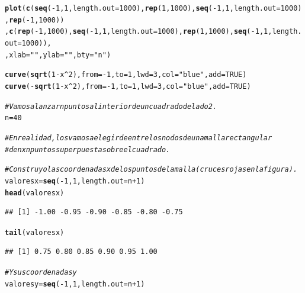 \documentclass[10pt,a4paper]{article}\usepackage[]{graphicx}\usepackage[]{color}
\makeatletter
\newcommand{\hlnum}[1]{\textcolor[rgb]{0.686,0.059,0.569}{#1}}%
\newcommand{\hlstr}[1]{\textcolor[rgb]{0.192,0.494,0.8}{#1}}%
\newcommand{\hlcom}[1]{\textcolor[rgb]{0.678,0.584,0.686}{\textit{#1}}}%
\newcommand{\hlopt}[1]{\textcolor[rgb]{0,0,0}{#1}}%
\newcommand{\hlstd}[1]{\textcolor[rgb]{0.345,0.345,0.345}{#1}}%
\newcommand{\hlkwb}[1]{\textcolor[rgb]{0.69,0.353,0.396}{#1}}%
\newcommand{\hlkwc}[1]{\textcolor[rgb]{0.333,0.667,0.333}{#1}}%
\newcommand{\hlkwd}[1]{\textcolor[rgb]{0.737,0.353,0.396}{\textbf{#1}}}%
\newenvironment{kframe}{%
 \def\at@end@of@kframe{}%
 \ifinner\ifhmode%
  \def\at@end@of@kframe{\end{minipage}}%
  \begin{minipage}{\columnwidth}%
 \fi\fi%
 \def\FrameCommand##1{\hskip\@totalleftmargin \hskip-\fboxsep
 \colorbox{shadecolor}{##1}\hskip-\fboxsep
     \hskip-\linewidth \hskip-\@totalleftmargin \hskip\columnwidth}%
 \MakeFramed {\advance\hsize-\width
   \@totalleftmargin\z@ \linewidth\hsize
   \@setminipage}}%
 {\par\unskip\endMakeFramed%
 \at@end@of@kframe}
\newenvironment{knitrout}{}{} %
\makeatother
\begin{document}
\begin{enumerate}
\begin{knitrout}
\begin{kframe}
\begin{alltt}
\hlkwd{plot}\hlstd{(}\hlkwd{c}\hlstd{(}\hlkwd{seq}\hlstd{(}\hlopt{-}\hlnum{1}\hlstd{,} \hlnum{1}\hlstd{,} \hlkwc{length.out} \hlstd{=} \hlnum{1000}\hlstd{),} \hlkwd{rep}\hlstd{(}\hlnum{1}\hlstd{,} \hlnum{1000}\hlstd{),} \hlkwd{seq}\hlstd{(}\hlopt{-}\hlnum{1}\hlstd{,} \hlnum{1}\hlstd{,} \hlkwc{length.out} \hlstd{=} \hlnum{1000}\hlstd{),} \hlkwd{rep}\hlstd{(}\hlopt{-}\hlnum{1}\hlstd{,} \hlnum{1000}\hlstd{))}
  \hlstd{,} \hlkwd{c}\hlstd{(}\hlkwd{rep}\hlstd{(}\hlopt{-}\hlnum{1}\hlstd{,} \hlnum{1000}\hlstd{),} \hlkwd{seq}\hlstd{(}\hlopt{-}\hlnum{1}\hlstd{,} \hlnum{1}\hlstd{,} \hlkwc{length.out} \hlstd{=} \hlnum{1000}\hlstd{),}\hlkwd{rep}\hlstd{(}\hlnum{1}\hlstd{,} \hlnum{1000}\hlstd{),}\hlkwd{seq}\hlstd{(}\hlopt{-}\hlnum{1}\hlstd{,} \hlnum{1}\hlstd{,} \hlkwc{length.out} \hlstd{=} \hlnum{1000}\hlstd{)),}
  \hlstd{,}\hlkwc{xlab}\hlstd{=}\hlstr{""}\hlstd{,} \hlkwc{ylab}\hlstd{=}\hlstr{""}\hlstd{,} \hlkwc{bty}\hlstd{=}\hlstr{"n"}\hlstd{)}

\hlkwd{curve}\hlstd{(}\hlkwd{sqrt}\hlstd{(}\hlnum{1}\hlopt{-}\hlstd{x}\hlopt{^}\hlnum{2}\hlstd{),}\hlkwc{from} \hlstd{=} \hlopt{-}\hlnum{1}\hlstd{,}\hlkwc{to} \hlstd{=} \hlnum{1}\hlstd{,} \hlkwc{lwd}\hlstd{=}\hlnum{3}\hlstd{,} \hlkwc{col}\hlstd{=}\hlstr{"blue"}\hlstd{,} \hlkwc{add}\hlstd{=}\hlnum{TRUE}\hlstd{)}
\hlkwd{curve}\hlstd{(}\hlopt{-}\hlkwd{sqrt}\hlstd{(}\hlnum{1}\hlopt{-}\hlstd{x}\hlopt{^}\hlnum{2}\hlstd{),}\hlkwc{from} \hlstd{=} \hlopt{-}\hlnum{1}\hlstd{,}\hlkwc{to} \hlstd{=} \hlnum{1}\hlstd{,} \hlkwc{lwd}\hlstd{=}\hlnum{3}\hlstd{,} \hlkwc{col}\hlstd{=}\hlstr{"blue"}\hlstd{,}\hlkwc{add} \hlstd{=} \hlnum{TRUE}\hlstd{)}

\hlcom{# Vamos a lanzar n puntos al interior de un cuadrado de lado 2.}
\hlstd{n} \hlkwb{=} \hlnum{40}

\hlcom{# En realidad, los vamos a elegir de entre los nodos de una malla rectangular}
\hlcom{# de n x n puntos superpuesta sobre el cuadrado.}

\hlcom{# Construyo las coordenadas x de los puntos de la malla (cruces rojas en la figura).}
\hlstd{valoresx} \hlkwb{=} \hlkwd{seq}\hlstd{(}\hlopt{-}\hlnum{1}\hlstd{,} \hlnum{1}\hlstd{,} \hlkwc{length.out} \hlstd{= n} \hlopt{+}\hlnum{1} \hlstd{)}
\hlkwd{head}\hlstd{(valoresx)}
\end{alltt}
\begin{verbatim}
## [1] -1.00 -0.95 -0.90 -0.85 -0.80 -0.75
\end{verbatim}
\begin{alltt}
\hlkwd{tail}\hlstd{(valoresx)}
\end{alltt}
\begin{verbatim}
## [1] 0.75 0.80 0.85 0.90 0.95 1.00
\end{verbatim}
\begin{alltt}
\hlcom{# Y sus coordenadas y}
\hlstd{valoresy} \hlkwb{=} \hlkwd{seq}\hlstd{(}\hlopt{-}\hlnum{1}\hlstd{,} \hlnum{1}\hlstd{,} \hlkwc{length.out} \hlstd{= n} \hlopt{+} \hlnum{1}\hlstd{)}


\end{alltt}
\end{kframe}
\end{knitrout}
\end{enumerate}
\end{document}
